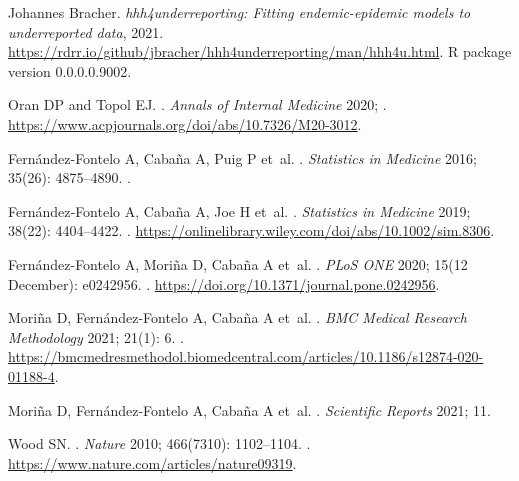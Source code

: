 \documentclass{article}
\begin{document}
\begin{thebibliography}{10}
  {Johannes Bracher}.
  \newblock \emph{{hhh4underreporting: Fitting endemic-epidemic models to
    underreported data}}, 2021.
  \newblock
    \urlprefix\url{https://rdrr.io/github/jbracher/hhh4underreporting/man/hhh4u.html}.
  \newblock R package version 0.0.0.0.9002.
  
  Oran DP and Topol EJ.
  .
  \newblock \emph{Annals of Internal Medicine} 2020; .
  \newblock \urlprefix\url{https://www.acpjournals.org/doi/abs/10.7326/M20-3012}.
  
  Fern{\'{a}}ndez-Fontelo A, Caba{\~{n}}a A, Puig P et~al.
  .
  \newblock \emph{Statistics in Medicine} 2016; 35(26): 4875--4890.
  \newblock {}.
  
  Fern{\'{a}}ndez‐Fontelo A, Caba{\~{n}}a A, Joe H et~al.
  .
  \newblock \emph{Statistics in Medicine} 2019; 38(22): 4404--4422.
  \newblock {}.
  \newblock
    \urlprefix\url{https://onlinelibrary.wiley.com/doi/abs/10.1002/sim.8306}.
  
  Fern{\'{a}}ndez-Fontelo A, Mori{\~{n}}a D, Caba{\~{n}}a A et~al.
  .
  \newblock \emph{PLoS ONE} 2020; 15(12 December): e0242956.
  \newblock {}.
  \newblock \urlprefix\url{https://doi.org/10.1371/journal.pone.0242956}.
  
  Mori{\~{n}}a D, Fern{\'{a}}ndez-Fontelo A, Caba{\~{n}}a A et~al.
  .
  \newblock \emph{BMC Medical Research Methodology} 2021; 21(1): 6.
  \newblock {}.
  \newblock
    \urlprefix\url{https://bmcmedresmethodol.biomedcentral.com/articles/10.1186/s12874-020-01188-4}.
  
  Mori{\~{n}}a D, Fern{\'{a}}ndez-Fontelo A, Caba{\~{n}}a A et~al.
  .
  \newblock \emph{Scientific Reports} 2021; 11.
  
  Wood SN.
  .
  \newblock \emph{Nature} 2010; 466(7310): 1102--1104.
  \newblock {}.
  \newblock \urlprefix\url{https://www.nature.com/articles/nature09319}.
  

\end{thebibliography}
\end{document}
